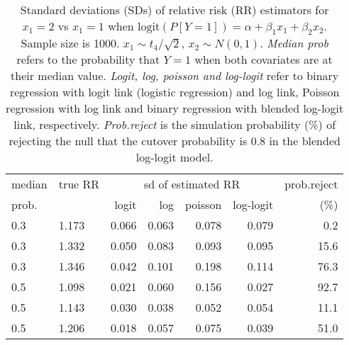 \documentclass[12pt,a4paper]{article}
\begin{document}
\begin{table}[H] 
\small\sf\centering 
\caption{Standard deviations (SDs) of relative risk (RR) estimators for $x_1=2$ vs $x_1=1$ when $\mbox{logit}(P[Y=1])=\alpha+\beta_1 x_1 + \beta_2 x_2$. Sample size is 1000. $x_1 \sim $$t_4/\sqrt{2}$, $x_2 \sim N(0,1)$. {\it Median prob} refers to the probability that $Y=1$ when both covariates are at their median value. {\it Logit, log, poisson and log-logit} refer to binary regression with logit link (logistic regression) and log link, Poisson regression with log link and binary regression with blended log-logit link, respectively. {\it Prob.reject} is the simulation probability (\%) of rejecting the null that the cutover probability is $0.8$ in the blended log-logit model.} 
\begin{tabular}{llrrrrr} 
\toprule 
median & true RR & \multicolumn{4}{c}{sd of estimated RR} & prob.reject \\ 
prob. & & logit & log & poisson & log-logit  & (\%) \\ \midrule 
0.3 & 1.173 & 0.066 & 0.063 & 0.078 & 0.079 &  0.2 \\  
0.3 & 1.332 & 0.050 & 0.083 & 0.093 & 0.095 & 15.6 \\  
0.3 & 1.346 & 0.042 & 0.101 & 0.198 & 0.114 & 76.3 \\  
0.5 & 1.098 & 0.021 & 0.060 & 0.156 & 0.027 & 92.7 \\  
0.5 & 1.143 & 0.030 & 0.038 & 0.052 & 0.054 & 11.1 \\  
0.5 & 1.206 & 0.018 & 0.057 & 0.075 & 0.039 & 51.0 \\  
\bottomrule 
\end{tabular} 
\end{table} 
\end{document}
